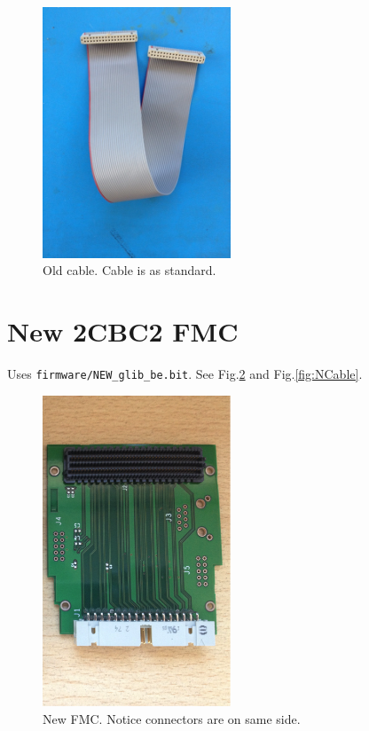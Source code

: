 \documentclass[11pt,a4paper]{article}
\begin{document}
\begin{figure}[htbp]
		\centering
                \includegraphics[width=0.5\textwidth, angle = 270]{fig/OldCable.png}
                \caption{Old cable. Cable is as standard.}
                \label{fig:OCable}
\end{figure}

	\section{New 2CBC2 FMC}
	
	Uses \verb|firmware/NEW_glib_be.bit|. See Fig.\ref{fig:NFMC} and Fig.\ref{fig:NCable}.	
	
\begin{figure} [htbp] 
        \centering
                \includegraphics[width=0.5\textwidth]{fig/NEW_FMC.png}
                \caption{New FMC. Notice connectors are on same side.}
                \label{fig:NFMC}
\end{figure}
\end{document}
